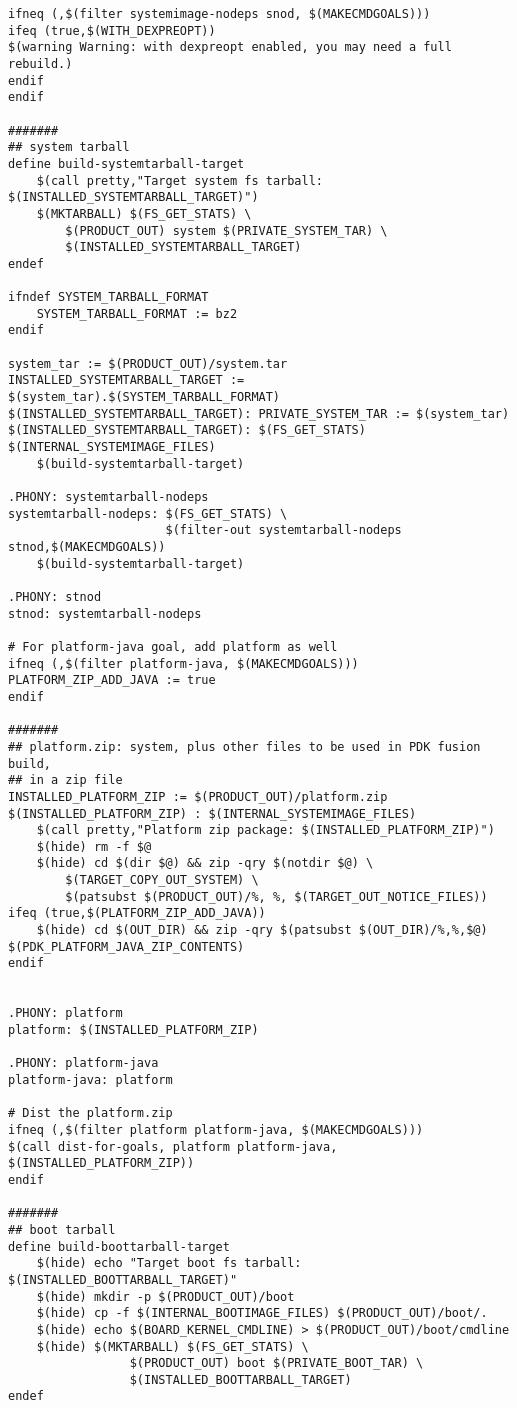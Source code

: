 \documentclass[12pt,a4paper]{article}
\begin{document}
\begin{verbatim}
ifneq (,$(filter systemimage-nodeps snod, $(MAKECMDGOALS)))
ifeq (true,$(WITH_DEXPREOPT))
$(warning Warning: with dexpreopt enabled, you may need a full rebuild.)
endif
endif

#######
## system tarball
define build-systemtarball-target
    $(call pretty,"Target system fs tarball: $(INSTALLED_SYSTEMTARBALL_TARGET)")
    $(MKTARBALL) $(FS_GET_STATS) \
		$(PRODUCT_OUT) system $(PRIVATE_SYSTEM_TAR) \
		$(INSTALLED_SYSTEMTARBALL_TARGET)
endef

ifndef SYSTEM_TARBALL_FORMAT
    SYSTEM_TARBALL_FORMAT := bz2
endif

system_tar := $(PRODUCT_OUT)/system.tar
INSTALLED_SYSTEMTARBALL_TARGET := $(system_tar).$(SYSTEM_TARBALL_FORMAT)
$(INSTALLED_SYSTEMTARBALL_TARGET): PRIVATE_SYSTEM_TAR := $(system_tar)
$(INSTALLED_SYSTEMTARBALL_TARGET): $(FS_GET_STATS) $(INTERNAL_SYSTEMIMAGE_FILES)
	$(build-systemtarball-target)

.PHONY: systemtarball-nodeps
systemtarball-nodeps: $(FS_GET_STATS) \
                      $(filter-out systemtarball-nodeps stnod,$(MAKECMDGOALS))
	$(build-systemtarball-target)

.PHONY: stnod
stnod: systemtarball-nodeps

# For platform-java goal, add platform as well
ifneq (,$(filter platform-java, $(MAKECMDGOALS)))
PLATFORM_ZIP_ADD_JAVA := true
endif

#######
## platform.zip: system, plus other files to be used in PDK fusion build,
## in a zip file
INSTALLED_PLATFORM_ZIP := $(PRODUCT_OUT)/platform.zip
$(INSTALLED_PLATFORM_ZIP) : $(INTERNAL_SYSTEMIMAGE_FILES)
	$(call pretty,"Platform zip package: $(INSTALLED_PLATFORM_ZIP)")
	$(hide) rm -f $@
	$(hide) cd $(dir $@) && zip -qry $(notdir $@) \
		$(TARGET_COPY_OUT_SYSTEM) \
		$(patsubst $(PRODUCT_OUT)/%, %, $(TARGET_OUT_NOTICE_FILES))
ifeq (true,$(PLATFORM_ZIP_ADD_JAVA))
	$(hide) cd $(OUT_DIR) && zip -qry $(patsubst $(OUT_DIR)/%,%,$@) $(PDK_PLATFORM_JAVA_ZIP_CONTENTS)
endif


.PHONY: platform
platform: $(INSTALLED_PLATFORM_ZIP)

.PHONY: platform-java
platform-java: platform

# Dist the platform.zip
ifneq (,$(filter platform platform-java, $(MAKECMDGOALS)))
$(call dist-for-goals, platform platform-java, $(INSTALLED_PLATFORM_ZIP))
endif

#######
## boot tarball
define build-boottarball-target
    $(hide) echo "Target boot fs tarball: $(INSTALLED_BOOTTARBALL_TARGET)"
    $(hide) mkdir -p $(PRODUCT_OUT)/boot
    $(hide) cp -f $(INTERNAL_BOOTIMAGE_FILES) $(PRODUCT_OUT)/boot/.
    $(hide) echo $(BOARD_KERNEL_CMDLINE) > $(PRODUCT_OUT)/boot/cmdline
    $(hide) $(MKTARBALL) $(FS_GET_STATS) \
                 $(PRODUCT_OUT) boot $(PRIVATE_BOOT_TAR) \
                 $(INSTALLED_BOOTTARBALL_TARGET)
endef


\end{verbatim}
\end{document}
